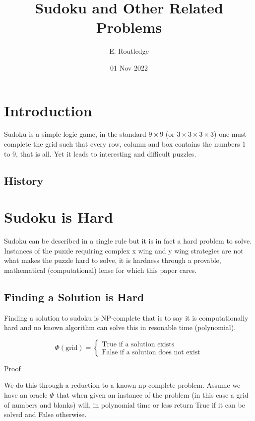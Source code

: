 \documentclass[a4paper,12pt]{article}
\author{E. Routledge}
\date{01 Nov 2022}
\title{Sudoku and Other Related Problems}
\begin{document}
\lstset{language=Python}
\maketitle

\section{Introduction}
		Sudoku is a simple logic game, in the standard $9 \times 9$ (or $3 \times 3 \times 3 \times 3$) 
		one must complete the grid such that every row, column and box contains the numbers 1 to 9, that is all. 
		Yet it leads to interesting and difficult puzzles.
	\subsection{History}
\section{Sudoku is Hard}

		Sudoku can be described in a single rule but it is in fact a hard problem to solve.
		Instances of the puzzle requiring complex x wing and y wing strategies are not what makes the puzzle hard to solve,
		it is hardness through a provable, mathematical (computational) lense for which this paper cares. 
		
	\subsection{Finding a Solution is Hard}
		
		Finding a solution to sudoku is NP-complete that is to say it is computationally hard and no known algorithm can solve this in resonable time (polynomial). 

		\begin{equation}
		        \Phi (\text{grid}) = \begin{cases}
		            \text{True if a solution exists} \\
		            \text{False if a solution does not exist}
				\end{cases}
		\end{equation}

		Proof
		
		We do this through a reduction to a known np-complete problem.
		Assume we have an oracle $\Phi$ that when given an instance of the problem (in this case a grid of numbers and blanks) will,
		in polynomial time or less return True if it can be solved and False otherwise.
\end{document}

